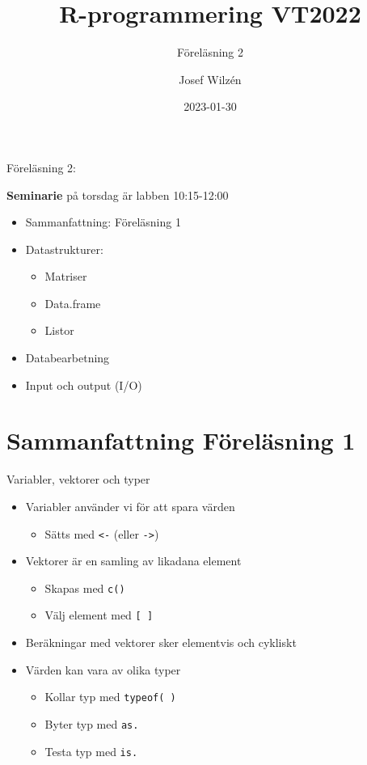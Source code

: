 \documentclass[
  11pt,
  ignorenonframetext,
]{beamer}
\title{R-programmering VT2022}
\subtitle{Föreläsning 2}
\author{Josef Wilzén}
\date{2023-01-30}
\institute{Linköpings Universitet}
\providecommand{\tightlist}{%
  \setlength{\itemsep}{0pt}\setlength{\parskip}{0pt}}
\begin{document}
\frame{\titlepage}


\begin{frame}{Föreläsning 2:}
\protect\hypertarget{fuxf6reluxe4sning-2}{}


\textbf{Seminarie} på torsdag är labben 10:15-12:00

\begin{itemize}
\tightlist
\item
  Sammanfattning: Föreläsning 1
\item
  Datastrukturer:

  \begin{itemize}
  \tightlist
  \item
    Matriser
  \item
    Data.frame
  \item
    Listor
  \end{itemize}
\item
  Databearbetning
\item
  Input och output (I/O)
\end{itemize}
\end{frame}

\hypertarget{sammanfattning-fuxf6reluxe4sning-1}{%
\section{Sammanfattning Föreläsning
1}\label{sammanfattning-fuxf6reluxe4sning-1}}


\begin{frame}{Variabler, vektorer och typer}
\protect\hypertarget{variabler-vektorer-och-typer}{}
\begin{itemize}
\tightlist
\item
  Variabler använder vi för att spara värden

  \begin{itemize}
  \tightlist
  \item
    Sätts med \texttt{<-} (eller \texttt{->})
  \end{itemize}
\item
  Vektorer är en samling av likadana element

  \begin{itemize}
  \tightlist
  \item
    Skapas med \texttt{c()}
  \item
    Välj element med \texttt{[ ]}
  \end{itemize}
\item
  Beräkningar med vektorer sker elementvis och cykliskt
\item
  Värden kan vara av olika typer

  \begin{itemize}
  \tightlist
  \item
    Kollar typ med \texttt{typeof( )}
  \item
    Byter typ med \texttt{as.}
  \item
    Testa typ med \texttt{is.}
  \end{itemize}
\end{itemize}
\end{frame}
\end{document}
